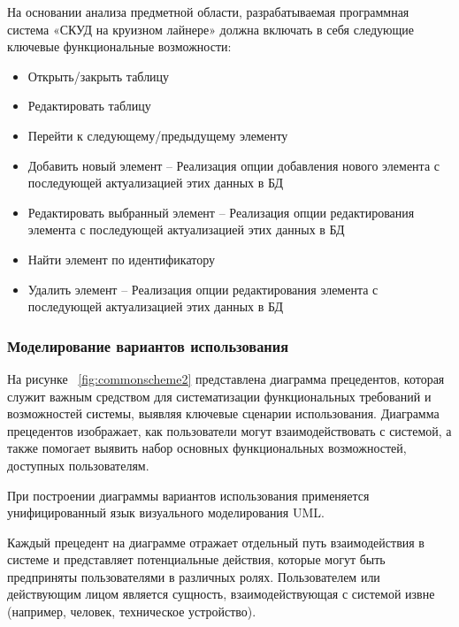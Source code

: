 На основании анализа предметной области, разрабатываемая программная система «СКУД на круизном лайнере» должна включать в себя следующие ключевые функциональные возможности:
\begin{itemize}
	\item Открыть/закрыть таблицу
	\item Редактировать таблицу
	\item Перейти к следующему/предыдущему элементу
	\item Добавить новый элемент -- Реализация опции добавления нового элемента с последующей актуализацией этих данных в БД 
	\item Редактировать выбранный элемент -- Реализация опции редактирования элемента с последующей актуализацией этих данных в БД 
	\item Найти элемент по идентификатору
	\item Удалить элемент -- Реализация опции редактирования элемента с последующей актуализацией этих данных в БД 
\end{itemize}

\subsubsection{Моделирование вариантов использования}

На рисунке  ~\ref{fig:commonscheme2} представлена диаграмма прецедентов, которая служит важным средством для систематизации функциональных требований и возможностей системы, выявляя ключевые сценарии использования. Диаграмма прецедентов изображает, как пользователи могут взаимодействовать с системой, а также помогает выявить набор основных функциональных возможностей, доступных пользователям.

При построении диаграммы вариантов использования применяется унифицированный язык визуального моделирования UML.

Каждый прецедент на диаграмме отражает отдельный путь взаимодействия в системе и представляет потенциальные действия, которые могут быть предприняты пользователями в различных ролях. Пользователем или действующим лицом является сущность, взаимодействующая с системой извне (например, человек, техническое устройство).

